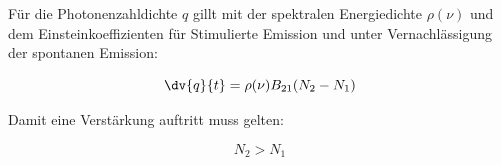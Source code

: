 \documentclass[slug=GL, room=HZDR\ Dresden/Rossendorf\,\ Geb.\ 620/123, supervisor=Martin\ Rehwald;\, Tim\ Ziegler]{../../Lab_Report_LaTeX/lab_report}
\begin{document}
F\"ur die Photonenzahldichte \(q\) gillt mit der spektralen
Energiedichte \(\rho(\nu)\) und dem Einsteinkoeffizienten f\"ur
Stimulierte Emission und unter Vernachl\"assigung der spontanen
Emission:

\begin{equation}
  \label{eq:qrate}
  \dv{q}{t}=\rho(\nu)B_{21}(N_2-N_1)
\end{equation}

Damit eine Verst\"arkung auftritt muss gelten:

\begin{equation}
  \label{eq:first}
  \tag{Erste Laserbedingung}
  N_2>N_1
\end{equation}
\end{document}
